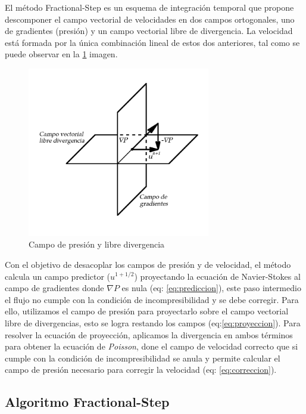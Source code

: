 \documentclass[a4paper,10pt, oneside]{book}
\begin{document}
El método Fractional-Step es un esquema de integración temporal que propone descomponer el campo vectorial de velocidades en dos campos ortogonales, uno de gradientes (presión) y un campo vectorial libre de divergencia. La velocidad está formada por la única combinación lineal de estos dos anteriores, tal como se puede observar en la \ref{fig:7-6} imagen.
\begin{figure}[hbt]
  \centering
  \includegraphics[width=8cm]{Img/7-6}
  \caption{Campo de presión y libre divergencia}
  \label{fig:7-6}
\end{figure}
Con el objetivo de desacoplar los campos de presión y de velocidad, el método calcula un campo predictor ($u^{1+1/2}$) proyectando la ecuación de Navier-Stokes al campo de gradientes donde $\nabla P$ es nula (eq: \ref{eq:prediccion}), este paso intermedio el flujo no cumple con la condición de incompresibilidad y se debe corregir. Para ello, utilizamos el campo de presión para proyectarlo sobre el campo vectorial libre de divergencias, esto se logra restando los campos (eq:\ref{eq:proyeccion}). Para resolver la ecuación de proyección, aplicamos la divergencia en ambos términos para obtener la ecuación de \textit{Poisson}, done el campo de velocidad correcto que si cumple con la condición de incompresibilidad se anula y permite calcular el campo de presión necesario para corregir la velocidad (eq: \ref{eq:correccion}).

\subsection{Algoritmo Fractional-Step}
\end{document}
